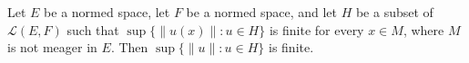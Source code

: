 Let \(E\) be a normed space, let \(F\) be a normed space, and let \(H\) be a subset of \(\mathcal{L}(E, F)\) such that \(\sup\{\|u(x)\| : u \in H\}\) is finite for every \(x \in M\), where \(M\) is not meager in \(E\). Then \(\sup\{\|u\| : u \in H\}\) is finite.